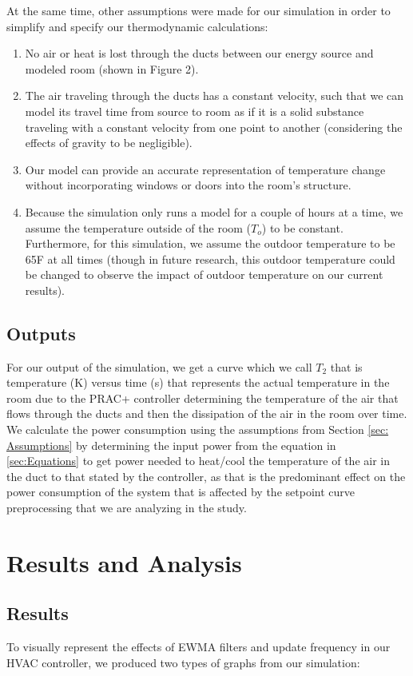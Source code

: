 \documentclass[conference,letterpaper]{IEEEtran}
\begin{document}
At the same time, other assumptions were made for our simulation in order to simplify and specify our thermodynamic calculations:
\begin{enumerate}
\item No air or heat is lost through the ducts between our energy source and modeled room (shown in Figure 2).
\item The air traveling through the ducts has a constant velocity, such that we can model its travel time from source to room as if it is a solid substance traveling with a constant velocity from one point to another (considering the effects of gravity to be negligible).
\item Our model can provide an accurate representation of temperature change without incorporating windows or doors into the room's structure.
\item Because the simulation only runs a model for a couple of hours at a time, we assume the temperature outside of the room ($T_o$) to be constant. Furthermore, for this simulation, we assume the outdoor temperature to be 65\degree F at all times (though in future research, this outdoor temperature could be changed to observe the impact of outdoor temperature on our current results).
\end{enumerate}

\subsection{Outputs}
\label{sec: outputs}
For our output of the simulation, we get a curve which we call $T_2$ that is temperature (K) versus time (s) that represents the actual temperature in the room due to the PRAC+ controller determining the temperature of the air that flows through the ducts and then the dissipation of the air in the room over time. We calculate the power consumption using the assumptions from Section \ref{sec: Assumptions} by determining the input power from the equation in \ref{sec:Equations} to get power needed to heat/cool the temperature of the air in the duct to that stated by the controller, as that is the predominant effect on the power consumption of the system that is affected by the setpoint curve preprocessing that we are analyzing in the study.

\section{Results and Analysis}
\label{sec:Results}
\subsection{Results}
    To visually represent the effects of EWMA filters and update frequency in our HVAC controller, we produced two types of graphs from our simulation:
\end{document}
